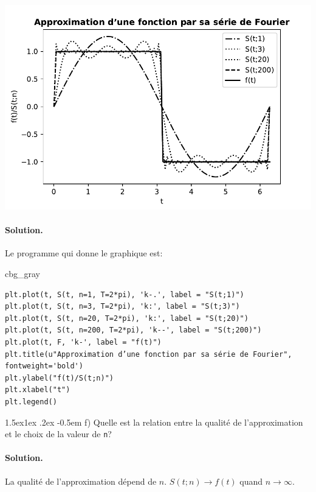 \documentclass[%
oneside,                 %
final,                   %
10pt,french]{article}
\makeatletter
\newenvironment{_cod_tight}[1]{
   \def\FrameCommand{\colorbox{#1}}
   \FrameRule0.6pt\MakeFramed {\FrameRestore}\vskip3mm}
   {\vskip0mm\endMakeFramed}
\newenvironment{cod}[1]{
\bgroup\rmfamily
\fboxsep=0mm\relax
\begin{_cod_tight}{#1}
\list{}{\parsep=-2mm\parskip=0mm\topsep=0pt\leftmargin=2mm
\rightmargin=2\leftmargin\leftmargin=4pt\relax}
\item\relax}
{\endlist\end{_cod_tight}\egroup}
\newenvironment{doconceexercise}{}{}
\newcommand\subex{\@startsection{paragraph}{4}{\z@}%
                  {1.5ex\@plus1ex \@minus.2ex}%
                  {-0.5em}%
                  {\normalfont\normalsize\bfseries}}
\makeatother
\begin{document}
\begin{doconceexercise}
\centerline{\includegraphics[width=1.0\linewidth]{imgs/fourier.pdf}}

\vspace{6mm}




\paragraph{Solution.}
Le programme qui donne le graphique est:
\begin{cod}{cbg_gray}\begin{verbatim}
plt.plot(t, S(t, n=1, T=2*pi), 'k-.', label = "S(t;1)")
plt.plot(t, S(t, n=3, T=2*pi), 'k:', label = "S(t;3)")
plt.plot(t, S(t, n=20, T=2*pi), 'k:', label = "S(t;20)")
plt.plot(t, S(t, n=200, T=2*pi), 'k--', label = "S(t;200)")
plt.plot(t, F, 'k-', label = "f(t)")
plt.title(u"Approximation d’une fonction par sa série de Fourier", fontweight='bold')
plt.ylabel("f(t)/S(t;n)")
plt.xlabel("t")
plt.legend()
\end{verbatim}
\end{cod}
\noindent


\subex{f)}
Quelle est la relation entre la qualité de l'approximation et le choix de la valeur de \texttt{n}?


\paragraph{Solution.}
La qualité de l'approximation dépend de $n$. $S(t;n)\rightarrow f(t)$ quand $n\rightarrow\infty$.


\end{doconceexercise}
\end{document}
